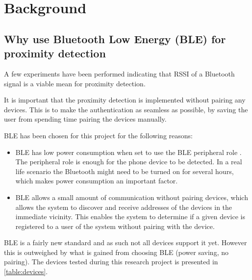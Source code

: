 \chapter{Background}

\section{Why use Bluetooth Low Energy (BLE) for proximity detection}

A few experiments have been performed indicating that RSSI of a Bluetooth signal is a viable mean for proximity detection\cite{ref:Takashi}. 

It is important that the proximity detection is implemented without pairing any devices. This is to make the authentication as seamless as possible, by saving the user from spending time pairing the devices manually.

BLE has been chosen for this project for the following reasons:
\begin{itemize}
	\item BLE has low power consumption when set to use the BLE peripheral role \cite{ref:Power_usage}. The peripheral role is enough for the phone device to be detected. In a real life scenario the Bluetooth might need to be turned on for several hours, which makes power consumption an important factor.
	\item BLE allows a small amount of communication without pairing devices, which allows the system to discover and receive addresses of the devices in the immediate vicinity. This enables the system to determine if a given device is registered to a user of the system without pairing with the device.
\end{itemize}

BLE is a fairly new standard and as such not all devices support it yet. However this is outweighed by what is gained from choosing BLE (power saving, no pairing\cite{ref:Power_usage}). The devices tested during this research project is presented in \cref{table:devices}.

